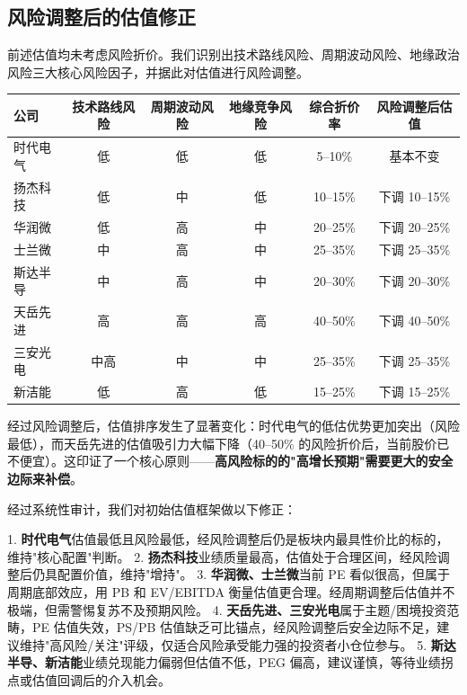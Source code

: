 \subsection{风险调整后的估值修正}

前述估值均未考虑风险折价。我们识别出技术路线风险、周期波动风险、地缘政治风险三大核心风险因子，并据此对估值进行风险调整。

\begin{exhibitbox}[表 7-12：风险因子评估与估值折价修正]
\centering
\small
\begin{tabularx}{\textwidth}{l c c c c c}
\toprule
\textbf{公司} & \textbf{技术路线风险} & \textbf{周期波动风险} & \textbf{地缘竞争风险} & \textbf{综合折价率} & \textbf{风险调整后估值} \\
\midrule
\rowcolor{riskgreen!10}
时代电气 & 低 & 低 & 低 & 5–10\% & 基本不变 \\
\rowcolor{riskgreen!10}
扬杰科技 & 低 & 中 & 低 & 10–15\% & 下调 10–15\% \\
\rowcolor{riskamber!10}
华润微 & 低 & 高 & 中 & 20–25\% & 下调 20–25\% \\
\rowcolor{riskamber!10}
士兰微 & 中 & 高 & 中 & 25–35\% & 下调 25–35\% \\
\rowcolor{riskamber!10}
斯达半导 & 中 & 高 & 中 & 20–30\% & 下调 20–30\% \\
\rowcolor{riskred!10}
天岳先进 & 高 & 高 & 高 & 40–50\% & 下调 40–50\% \\
\rowcolor{riskred!10}
三安光电 & 中高 & 中 & 中 & 25–35\% & 下调 25–35\% \\
\rowcolor{riskamber!10}
新洁能 & 低 & 高 & 低 & 15–25\% & 下调 15–25\% \\
\bottomrule
\end{tabularx}
\end{exhibitbox}

经过风险调整后，估值排序发生了显著变化：时代电气的低估优势更加突出（风险最低），而天岳先进的估值吸引力大幅下降（40–50\% 的风险折价后，当前股价已不便宜）。这印证了一个核心原则——\textbf{高风险标的的"高增长预期"需要更大的安全边际来补偿}。

\begin{keyinsight}[估值审计核心结论]
经过系统性审计，我们对初始估值框架做以下修正：

1. \textbf{时代电气}估值最低且风险最低，经风险调整后仍是板块内最具性价比的标的，维持"核心配置"判断。
2. \textbf{扬杰科技}业绩质量最高，估值处于合理区间，经风险调整后仍具配置价值，维持"增持"。
3. \textbf{华润微、士兰微}当前 PE 看似很高，但属于周期底部效应，用 PB 和 EV/EBITDA 衡量估值更合理。经周期调整后估值并不极端，但需警惕复苏不及预期风险。
4. \textbf{天岳先进、三安光电}属于主题/困境投资范畴，PE 估值失效，PS/PB 估值缺乏可比锚点，经风险调整后安全边际不足，建议维持"高风险/关注"评级，仅适合风险承受能力强的投资者小仓位参与。
5. \textbf{斯达半导、新洁能}业绩兑现能力偏弱但估值不低，PEG 偏高，建议谨慎，等待业绩拐点或估值回调后的介入机会。
\end{keyinsight}
